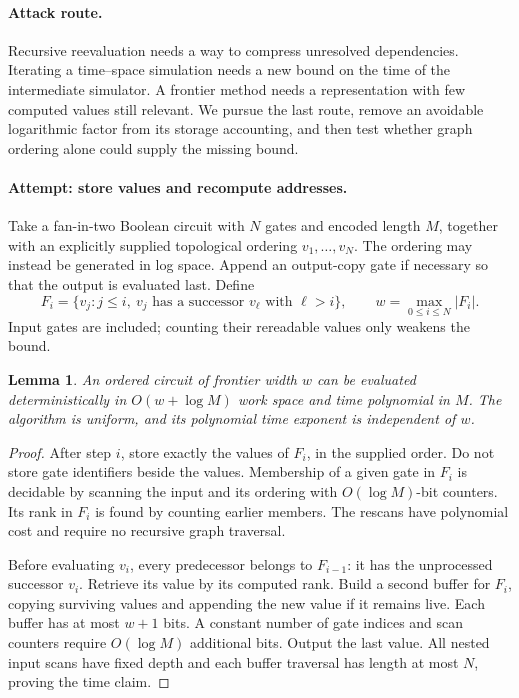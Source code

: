 \documentclass[11pt,a4paper]{article}
\newtheorem{notebooklemma}{Lemma}[section]
\numberwithin{equation}{section}
\begin{document}
\paragraph{Attack route.}
Recursive reevaluation needs a way to compress unresolved dependencies. Iterating a time--space simulation needs a new bound on the time of the intermediate simulator. A frontier method needs a representation with few computed values still relevant. We pursue the last route, remove an avoidable logarithmic factor from its storage accounting, and then test whether graph ordering alone could supply the missing bound.

\paragraph{Attempt: store values and recompute addresses.}
Take a fan-in-two Boolean circuit with $N$ gates and encoded length $M$, together with an explicitly supplied topological ordering $v_1,\ldots,v_N$. The ordering may instead be generated in log space. Append an output-copy gate if necessary so that the output is evaluated last. Define
\begin{equation}\label{r60:frontier}
 F_i=\{v_j:j\le i,\ \text{$v_j$ has a successor $v_\ell$ with $\ell>i$}\},
 \qquad w=\max_{0\le i\le N}|F_i|.
\end{equation}
Input gates are included; counting their rereadable values only weakens the bound.

\begin{notebooklemma}\label{r60:stream}
An ordered circuit of frontier width $w$ can be evaluated deterministically in $O(w+\log M)$ work space and time polynomial in $M$. The algorithm is uniform, and its polynomial time exponent is independent of $w$.
\end{notebooklemma}
\begin{proof}
After step $i$, store exactly the values of $F_i$, in the supplied order. Do not store gate identifiers beside the values. Membership of a given gate in $F_i$ is decidable by scanning the input and its ordering with $O(\log M)$-bit counters. Its rank in $F_i$ is found by counting earlier members. The rescans have polynomial cost and require no recursive graph traversal.

Before evaluating $v_i$, every predecessor belongs to $F_{i-1}$: it has the unprocessed successor $v_i$. Retrieve its value by its computed rank. Build a second buffer for $F_i$, copying surviving values and appending the new value if it remains live. Each buffer has at most $w+1$ bits. A constant number of gate indices and scan counters require $O(\log M)$ additional bits. Output the last value. All nested input scans have fixed depth and each buffer traversal has length at most $N$, proving the time claim.
\end{proof}
\end{document}
